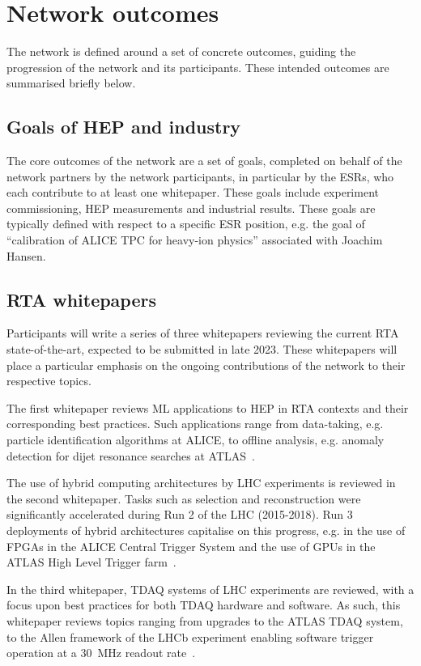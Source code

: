 \section{Network outcomes}
\label{outcomes}
The network is defined around a set of concrete outcomes, guiding the progression of the network and its participants. These intended outcomes are summarised briefly below.

\subsection{Goals of HEP and industry}
\label{goals}
The core outcomes of the network are a set of goals, completed on behalf of the network partners by the network participants, in particular by the ESRs, who each contribute to at least one whitepaper.  These goals include experiment commissioning, HEP measurements and industrial results. These goals are typically defined with respect to a specific ESR position, e.g. the goal of ``calibration of ALICE TPC for heavy-ion physics'' associated with Joachim Hansen.

\subsection{RTA whitepapers}
\label{whitepapers}
Participants will write a series of three whitepapers reviewing the current RTA state-of-the-art, expected to be submitted in late 2023. These whitepapers will place a particular emphasis on the ongoing contributions of the network to their respective topics.

The first whitepaper reviews ML applications to HEP in RTA contexts and their corresponding best practices. Such applications range from data-taking, e.g. particle identification algorithms at ALICE, to offline analysis, e.g. anomaly detection for dijet resonance searches at ATLAS~\cite{ALICE-PID, ATLAS-dijet}.

The use of hybrid computing architectures by LHC experiments is reviewed in the second whitepaper. Tasks such as selection and reconstruction were significantly accelerated during Run 2 of the LHC (2015-2018). Run 3 deployments of hybrid architectures capitalise on this progress, e.g. in the use of FPGAs in the ALICE Central Trigger System and the use of GPUs in the ATLAS High Level Trigger farm~\cite{ALICE-CTS, CMS-HLT-farm}.

In the third whitepaper, TDAQ systems of LHC experiments are reviewed, with a focus upon best practices for both TDAQ hardware and software. As such, this whitepaper reviews topics ranging from upgrades to the ATLAS TDAQ system, to the Allen framework of the LHCb experiment enabling software trigger operation at a 30~MHz readout rate~\cite{ATLAS-TDAQ, LHCb-Allen}.

